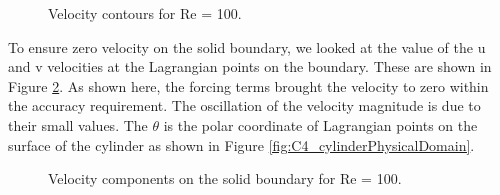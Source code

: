 \begin{figure}[H]
    \centering
    \quad
    \caption{Velocity contours for Re = 100.}
    \label{fig:C4_contourPlotsForFlowOverCylidnerGE}
\end{figure}

To ensure zero velocity on the solid boundary, we looked at the value of the u and v velocities at the Lagrangian points on the boundary. These are shown in Figure \ref{fig:C4_fluidVelocityOnCylinder}. As shown here, the forcing terms brought the velocity to zero within the accuracy requirement. The oscillation of the velocity magnitude is due to their small values. The $\theta$ is the polar coordinate of Lagrangian points on the surface of the cylinder as shown in Figure \ref{fig:C4_cylinderPhysicalDomain}.

\begin{figure}[H]
    \centering
    \quad
    \caption{Velocity components on the solid boundary for Re = 100.}
    \label{fig:C4_fluidVelocityOnCylinder}
\end{figure}

